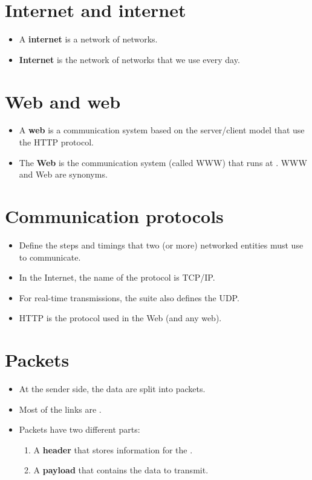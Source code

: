 \section{Internet and internet}
\begin{itemize}
\item A \textbf{internet} is a network of networks.
\item \textbf{Internet} is the network of networks that we use every day.
\end{itemize}

\section{Web and web}
\begin{itemize}
\item A \textbf{web} is a communication system based on the
server/client model that use the \gls{HTTP} protocol.
\item The \textbf{Web} is the communication system (called \gls{WWW})
that runs at . \gls{WWW} and Web are synonyms.
\end{itemize}

\section{Communication protocols}
\begin{itemize}
\item Define the steps and timings that two (or more) networked
entities must use to communicate.
\item In the Internet, the name of the protocol  is \acrshort{TCP}/\acrshort{IP}.
\item For real-time transmissions, the suite also defines the
\gls{UDP}.
\item \gls{HTTP} is the protocol used in the Web (and any web).
\end{itemize}

\section{Packets}
\begin{itemize}
\item At the sender side, the data are split into packets.
\item Most of the links are .
\item Packets have two different parts:
\begin{enumerate}
\item A \textbf{header} that stores information for the .
\item A \textbf{payload} that contains the data to transmit.
\end{enumerate}
\end{itemize}
